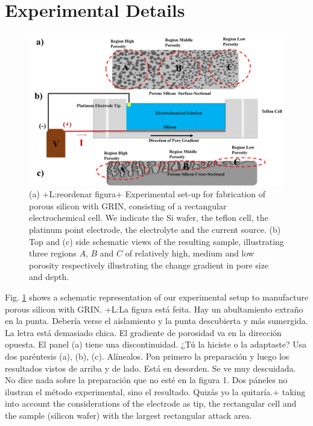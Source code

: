 \documentclass{article}
\newcommand{\notaL}[1]{{\color{blue}+L:#1+}}
\begin{document}
\section{Experimental Details}
\begin{figure}
  \centering
  \includegraphics[scale=0.6]{Images/DE1}
\caption{(a) \notaL{reordenar figura} Experimental set-up for
      fabrication of porous silicon with GRIN, consisting of a
      rectangular electrochemical cell. We indicate the Si wafer, the
      teflon cell, the platinum point electrode, the electrolyte and the
      current source. (b) Top and (c) side schematic views of the resulting sample,
      illustrating three regions $A$, $B$ and $C$ of relatively high, medium and
      low porosity respectively illustrating the change gradient in
      pore size and depth. }
    \label{fig:DE1}
  \end{figure}

Fig. \ref{fig:DE1} shows a schematic representation of our
experimental setup to manufacture porous silicon with GRIN.
\notaL{La figura está feita. Hay un abultamiento extraño en la
  punta. Debería verse el aislamiento y la punta descubierta y más
  sumergida. La letra está demasiado chica. El gradiente de porosidad va
  en la dirección opuesta. El panel (a) tiene una discontinuidad. ¿Tú
  la hiciste o la adaptaste? Usa dos paréntesis (a), (b),
  (c). Alínealos. Pon primero la preparación y luego los resultados
  vistos de arriba y de lado. Está en desorden. Se ve muy descuidada. No dice nada sobre la
  preparación que no esté en la figura 1. Dos páneles no ilustran el
  método experimental, sino el resultado. Quizás yo la quitaría.}
taking into account the considerations of the electrode as tip, the
rectangular cell and the sample (silicon wafer) with the largest
rectangular attack area.
\end{document}
